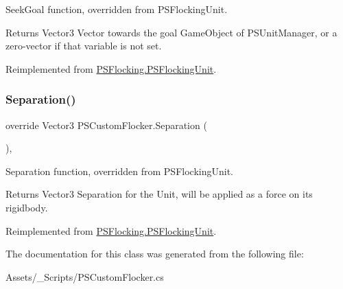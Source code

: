 Seek\+Goal function, overridden from P\+S\+Flocking\+Unit. 

\begin{DoxyReturn}{Returns}
Vector3 Vector towards the goal Game\+Object of P\+S\+Unit\+Manager, or a zero-\/vector if that variable is not set. 
\end{DoxyReturn}


Reimplemented from \hyperlink{class_p_s_flocking_1_1_p_s_flocking_unit_ab2ce12145c79e5e179f841412ed2febb}{P\+S\+Flocking.\+P\+S\+Flocking\+Unit}.

\mbox{\label{class_p_s_custom_flocker_a2ab0990e603a5102fc80dafee1333c7c}} 
\subsubsection{\texorpdfstring{Separation()}{Separation()}}
{\footnotesize\ttfamily override Vector3 P\+S\+Custom\+Flocker.\+Separation (\begin{DoxyParamCaption}{ }\end{DoxyParamCaption})\hspace{0.3cm}{\ttfamily [protected]}, {\ttfamily [virtual]}}



Separation function, overridden from P\+S\+Flocking\+Unit. 

\begin{DoxyReturn}{Returns}
Vector3 Separation for the Unit, will be applied as a force on its rigidbody. 
\end{DoxyReturn}


Reimplemented from \hyperlink{class_p_s_flocking_1_1_p_s_flocking_unit_af486901d480a5520aeae135d46635e60}{P\+S\+Flocking.\+P\+S\+Flocking\+Unit}.



The documentation for this class was generated from the following file\+:\begin{DoxyCompactItemize}
\item 
Assets/\+\_\+\+Scripts/P\+S\+Custom\+Flocker.\+cs\end{DoxyCompactItemize}
